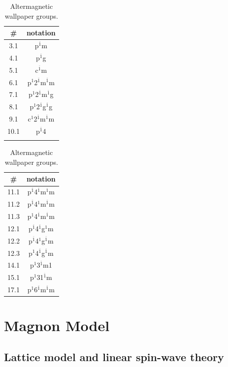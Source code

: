 \documentclass[aps,preprintnumbers,amsmath,amssymb]{revtex4-2}
\begin{document}
\begin{table}[h]
\renewcommand{\arraystretch}{1.4} %
\centering
\begin{tabular}{ |c|c| }
 \hline
 \# & notation\\
 \hline
3.1 & p$^{\overline{1}}$m\\
4.1 &p$^{\overline{1}}$g\\
5.1 &c$^{\overline{1}}$m\\
6.1 &p$^1$2$^{\overline{1}}$m$^{\overline{1}}$m\\
7.1 &p$^1$2$^{\overline{1}}$m$^{\overline{1}}$g\\
8.1 &p$^1$2$^{\overline{1}}$g$^{\overline{1}}$g\\
9.1 &c$^1$2$^{\overline{1}}$m$^{\overline{1}}$m\\
10.1 &p$^{\overline{1}}$4\\
&\\
\hline
\end{tabular}
\begin{tabular}{ |c|c| }
 \hline
 \# & notation\\
 \hline
11.1 &p$^{\overline{1}}$4$^{\overline{1}}$m$^1$m\\
11.2 &p$^{\overline{1}}$4$^1$m$^{\overline{1}}$m\\
11.3 &p$^1$4$^{\overline{1}}$m$^{\overline{1}}$m\\
12.1 &p$^{\overline{1}}$4$^{\overline{1}}$g$^1$m\\
12.2 &p$^{\overline{1}}$4$^1$g$^{\overline{1}}$m\\
12.3 &p$^1$4$^{\overline{1}}$g$^{\overline{1}}$m\\
14.1 &p$^1$3$^{\overline{1}}$m1\\
15.1 &p$^1$31$^{\overline{1}}$m\\
17.1 &p$^1$6$^{\overline{1}}$m$^{\overline{1}}$m\\
\hline
\end{tabular}
\caption{Altermagnetic wallpaper groups.}
\label{tab:AM_SWG}
\end{table}


\newpage

\section{Magnon Model}

\subsection{Lattice model and linear spin-wave theory}\label{sec:MagnonLatticeLSWT}
\end{document}
